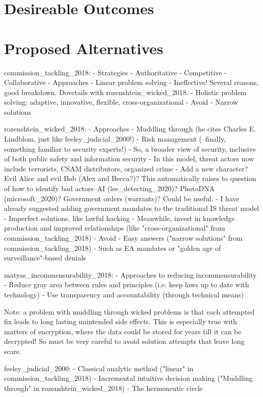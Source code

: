 \section{Desireable Outcomes}

\section{Proposed Alternatives}


commission_tackling_2018:
- Strategies
  - Authoritative
  - Competitive
  - Collaborative
- Approaches
  - Linear problem solving
    - Ineffective! Several reasons, good breakdown. Dovetails with rozenshtein_wicked_2018.
  - Holistic problem solving: adaptive, innovative, flexible, cross-organizational
- Avoid
  - Narrow solutions

rozenshtein_wicked_2018:
- Approaches
  - Muddling through (he cites Charles E. Lindblom, just like feeley_judicial_2000!)
  - Risk management (--finally, something familiar to security experts!)
    - So, a broader view of security, inclusive of both public safety and information security
    - In this model, threat actors now include terrorists, CSAM distributors, organized crime
      - Add a new character? Evil Alice and evil Bob (Alex and Becca?)? This automatically raises to question of how to
          identify bad actors--AI (lee_detecting_2020)? PhotoDNA (microsoft_2020)? Government orders (warrants)? Could
          be useful.
    - I have already suggested adding government mandates to the traditional IS threat model
  - Imperfect solutions, like lawful hacking
  - Meanwhile, invest in knowledge production and improved relationships (like "cross-organizational" from
      commission_tackling_2018)
- Avoid
  - Easy answers ("narrow solutions" from commission_tackling_2018)
    - Such as EA mandates or "golden age of surveillance"-based denials

matyas_incommensurability_2018:
- Approaches to reducing incommensurability
  - Reduce gray area between rules and principles (i.e. keep laws up to date with technology)
  - Use transparency and accountability (through technical means)

Note: a problem with muddling through wicked problems is that each attempted fix leads to long lasting unintended side
effects. This is especially true with matters of encryption, where the data could be stored for years till it can be
decrypted! So must be very careful to avoid solution attempts that leave long scars.

feeley_judicial_2000:
- Classical analytic method ("linear" in commission_tackling_2018)
- Incremental intuitive decision making ("Muddling through" in rozenshtein_wicked_2018)
- The hermeneutic circle

